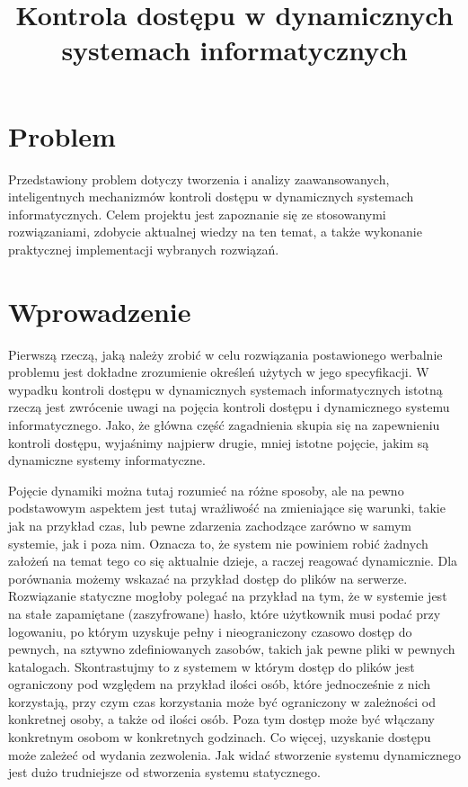 \documentclass{classrep}
\author{%
  \studentinfo{Mateusz Grotek}{186816} \and
  \studentinfo{Mateusz Jakóbczak}{186819} \and
  \studentinfo{Rafał Jurkiewicz}{186822} \and
  \studentinfo{Łukasz Kotyński}{186829} \and
  \studentinfo{Paweł Tarasiuk}{186875}
}
\title{Kontrola dostępu w dynamicznych systemach informatycznych}
\begin{document}
\maketitle

\section{Problem}
Przedstawiony problem dotyczy tworzenia i analizy zaawansowanych, inteligentnych mechanizmów kontroli dostępu w dynamicznych systemach informatycznych. Celem projektu jest
zapoznanie się ze stosowanymi rozwiązaniami, zdobycie aktualnej wiedzy na ten temat, a także wykonanie praktycznej implementacji wybranych rozwiązań.
\section{Wprowadzenie}
Pierwszą rzeczą, jaką należy zrobić w celu rozwiązania postawionego werbalnie problemu jest dokładne zrozumienie określeń użytych w jego specyfikacji. W wypadku
kontroli dostępu w dynamicznych systemach informatycznych istotną rzeczą jest zwrócenie uwagi na pojęcia kontroli dostępu i dynamicznego systemu informatycznego. Jako, że główna
część zagadnienia skupia się na zapewnieniu kontroli dostępu, wyjaśnimy najpierw drugie, mniej istotne pojęcie, jakim są dynamiczne systemy informatyczne.

Pojęcie dynamiki można tutaj
rozumieć na różne sposoby, ale na pewno podstawowym aspektem jest tutaj wrażliwość na zmieniające się warunki, takie jak na przykład czas, lub pewne zdarzenia zachodzące zarówno 
w samym systemie, jak i poza nim. Oznacza to, że system nie powiniem robić żadnych założeń na temat tego co się aktualnie dzieje, a raczej reagować dynamicznie. Dla porównania
możemy wskazać na przykład dostęp do plików na serwerze. Rozwiązanie statyczne mogłoby polegać na przykład na tym, że w systemie jest na stałe zapamiętane (zaszyfrowane) hasło,
które użytkownik musi podać przy logowaniu, po którym uzyskuje pełny i nieograniczony czasowo dostęp do pewnych, na sztywno zdefiniowanych zasobów, takich jak pewne pliki w pewnych katalogach.
Skontrastujmy to z systemem w którym dostęp do plików jest ograniczony pod względem na przykład ilości osób, które jednocześnie z nich korzystają, przy czym czas korzystania może być ograniczony
w zależności od konkretnej osoby, a także od ilości osób. Poza tym dostęp może być włączany konkretnym osobom w konkretnych godzinach. Co więcej, uzyskanie dostępu może zależeć od
wydania zezwolenia. Jak widać stworzenie systemu dynamicznego jest dużo trudniejsze od stworzenia systemu statycznego.
\end{document}
